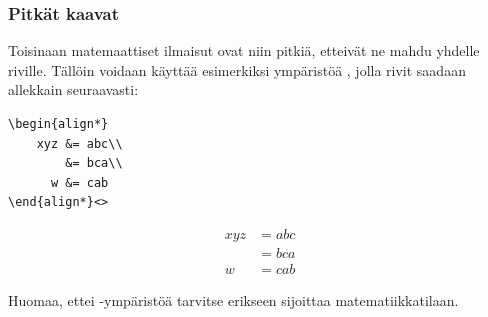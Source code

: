 \begin{frame}[fragile]
    \frametitle{Pitkät kaavat}
    Toisinaan matemaattiset ilmaisut ovat niin pitkiä, etteivät ne mahdu yhdelle riville. Tällöin voidaan käyttää esimerkiksi ympäristöä , jolla rivit saadaan allekkain seuraavasti:

    \begin{minipage}{4cm}
        \begin{lstlisting} 
\begin{align*}
    xyz &= abc\\
        &= bca\\
      w &= cab
\end{align*}<>
        \end{lstlisting}
    \end{minipage}
    \begin{minipage}{4cm}
        \begin{serif}
            \begin{align*}
                xyz &= abc\\
                    &= bca\\
                  w &= cab
            \end{align*}
        \end{serif}
    \end{minipage}

    Huomaa, ettei -ympäristöä tarvitse erikseen sijoittaa matematiikkatilaan.
\end{frame}

